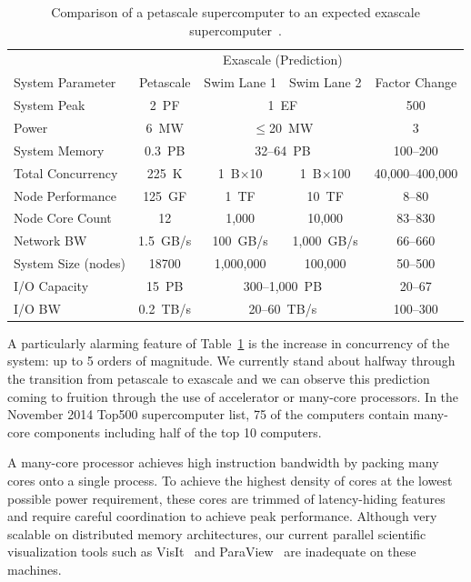 \documentclass{superfri}
\newcommand*{\lcite}[1]{~\cite{#1}}
\begin{document}
\begin{table}[htdp]
  \centering
  \caption{Comparison of a petascale supercomputer to an expected exascale
    supercomputer\lcite{ScientificDiscoveryExascale2011}.}
  \label{table:PetascaleVsExascale}
  \begin{tabular}{@{}lcccc@{}}
    \toprule
    & & \multicolumn{2}{c}{Exascale (Prediction)} & \\
    System Parameter & Petascale & Swim Lane 1 & Swim Lane 2 & Factor Change \\
    \midrule
    System Peak & 2~PF & \multicolumn{2}{c}{1~EF} & 500 \\
    Power & 6~MW & \multicolumn{2}{c}{$\le$20~MW} & 3\\
    System Memory & 0.3~PB & \multicolumn{2}{c}{32--64~PB} & 100--200 \\ %
    Total Concurrency & 225~K & 1~B$\times$10 & 1~B$\times$100 & 40,000--400,000 \\
    Node Performance & 125~GF & 1~TF & 10~TF & 8--80\\
    Node Core Count & 12 & 1,000 & 10,000 & 83--830 \\
    Network BW & 1.5~GB/s & 100~GB/s & 1,000~GB/s & 66--660 \\
    System Size (nodes) & 18700 & 1,000,000 & 100,000 & 50--500 \\
    I/O Capacity & 15~PB & \multicolumn{2}{c}{300--1,000~PB} & 20--67\\
    I/O BW & 0.2~TB/s & \multicolumn{2}{c}{20--60~TB/s} & 100--300 \\
    \bottomrule
  \end{tabular}
\end{table}

A particularly alarming feature of Table~\ref{table:PetascaleVsExascale} is
the increase in concurrency of the system: up to 5 orders of magnitude. We
currently stand about halfway through the transition from petascale to
exascale and we can observe this prediction coming to fruition through the
use of accelerator or many-core processors. In the November 2014 Top500
supercomputer list, 75 of the computers contain many-core components
including half of the top 10 computers.

A many-core processor achieves high instruction bandwidth by packing many
cores onto a single process. To achieve the highest density of cores at the
lowest possible power requirement, these cores are trimmed of
latency-hiding features and require careful coordination to achieve peak
performance. Although very scalable on distributed memory architectures,
our current parallel scientific visualization tools such as
VisIt\lcite{VisIt} and ParaView\lcite{ParaView} are inadequate on these
machines.
\end{document}
